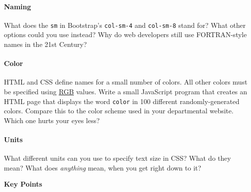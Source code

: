\paragraph{Naming}\label{naming}

What does the \texttt{sm} in Bootstrap's \texttt{col-sm-4} and
\texttt{col-sm-8} stand for? What other options could you use instead?
Why do web developers still use FORTRAN-style names in the 21st Century?

\paragraph{Color}\label{color}

HTML and CSS define names for a small number of colors. All other colors
must be specified using \protect\hyperlink{g:rgb}{RGB} values. Write a
small JavaScript program that creates an HTML page that displays the
word \texttt{color} in 100 different randomly-generated colors. Compare
this to the color scheme used in your departmental website. Which one
hurts your eyes less?

\paragraph{Units}\label{units}

What different units can you use to specify text size in CSS? What do
they mean? What does \emph{anything} mean, when you get right down to
it?

\textbf{Key Points}

